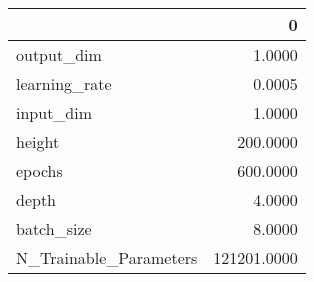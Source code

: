 \begin{tabular}{lr}
\toprule
{} &            0 \\
\midrule
output\_dim             &       1.0000 \\
learning\_rate          &       0.0005 \\
input\_dim              &       1.0000 \\
height                 &     200.0000 \\
epochs                 &     600.0000 \\
depth                  &       4.0000 \\
batch\_size             &       8.0000 \\
N\_Trainable\_Parameters &  121201.0000 \\
\bottomrule
\end{tabular}
